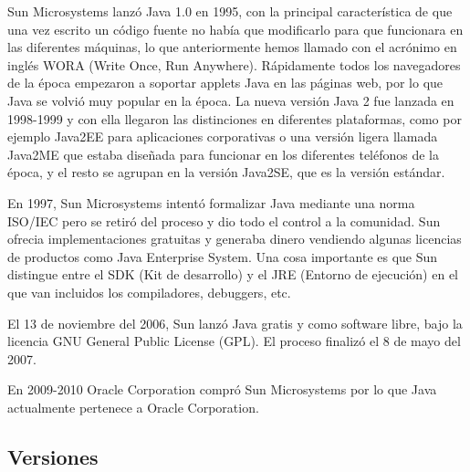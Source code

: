 Sun Microsystems lanzó Java 1.0 en 1995, con la principal característica de que una vez escrito un código fuente no había que modificarlo para que funcionara en las diferentes máquinas, lo que anteriormente hemos llamado con el acrónimo en inglés WORA (Write Once, Run Anywhere). Rápidamente todos los navegadores de la época empezaron a soportar applets Java en las páginas web, por lo que Java se volvió muy popular en la época. La nueva versión Java 2 fue lanzada en 1998-1999 y con ella llegaron las distinciones en diferentes plataformas, como por ejemplo Java2EE para aplicaciones corporativas o una versión ligera llamada Java2ME que estaba diseñada para funcionar en los diferentes teléfonos de la época, y el resto se agrupan en la versión Java2SE, que es la versión estándar.

En 1997, Sun Microsystems intentó formalizar Java mediante una norma ISO/IEC pero se retiró del proceso y dio todo el control a la comunidad. Sun ofrecia implementaciones gratuitas y generaba dinero vendiendo algunas licencias de productos como Java Enterprise System. Una cosa importante es que Sun distingue entre el SDK (Kit de desarrollo) y el JRE (Entorno de ejecución) en el que van incluidos los compiladores, debuggers, etc.

El 13 de noviembre del 2006, Sun lanzó Java gratis y como software libre, bajo la licencia GNU General Public License (GPL). El proceso finalizó el 8 de mayo del 2007.

En 2009-2010 Oracle Corporation compró Sun Microsystems por lo que Java actualmente pertenece a Oracle Corporation.

\subsection{Versiones}

